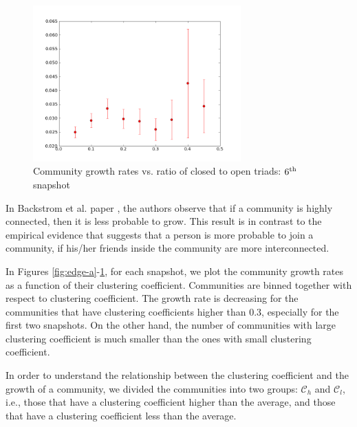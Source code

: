 \begin{figure}
  \begin{center}
    \includegraphics[width=8cm]{../figures/sixth.png}
    \caption{Community growth rates vs. ratio of closed to open triads: $6^{\rm th}$ snapshot}\label{fig:edge-f}
    \end{center}
\end{figure}

In Backstrom et al. paper \cite{group_formation}, the authors observe that if a community is highly connected, then it is less probable to grow.  This result is in contrast to the empirical evidence \cite{group_formation}  that suggests that a person is more probable to join a community,  if his/her friends inside the community are more interconnected.



In Figures \ref{fig:edge-a}-\ref{fig:edge-f}, for each snapshot, we plot the community growth rates  as a function of their clustering coefficient.  Communities are binned together with respect to clustering coefficient. The growth rate is  decreasing for the communities that have clustering coefficients  higher than $0.3$, especially for the first two snapshots.  On the other hand, the number of communities  with large clustering coefficient  is much smaller than the ones with small clustering coefficient.



In order to understand the relationship between  the clustering coefficient and the growth of a community, we divided 
the communities into two groups: $\mathcal{C}_h$ and $\mathcal{C}_l$, i.e., those that have  a clustering coefficient higher than the average, and those that have a  clustering coefficient less than the average. 



